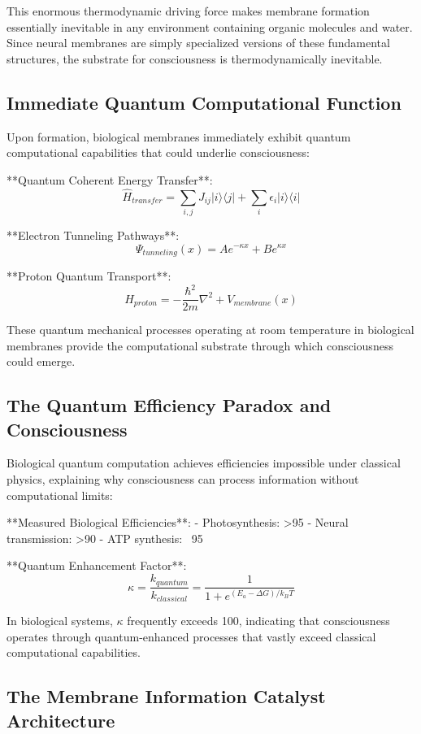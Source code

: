 \documentclass[12pt]{article}
\begin{document}
This enormous thermodynamic driving force makes membrane formation essentially inevitable in any environment containing organic molecules and water. Since neural membranes are simply specialized versions of these fundamental structures, the substrate for consciousness is thermodynamically inevitable.

\subsection{Immediate Quantum Computational Function}

Upon formation, biological membranes immediately exhibit quantum computational capabilities that could underlie consciousness:

**Quantum Coherent Energy Transfer**:
$$\hat{H}_{transfer} = \sum_{i,j} J_{ij} |i\rangle\langle j| + \sum_i \epsilon_i |i\rangle\langle i|$$

**Electron Tunneling Pathways**:
$$\Psi_{tunneling}(x) = A e^{-\kappa x} + B e^{\kappa x}$$

**Proton Quantum Transport**:
$$\hat{H}_{proton} = -\frac{\hbar^2}{2m}\nabla^2 + V_{membrane}(x)$$

These quantum mechanical processes operating at room temperature in biological membranes provide the computational substrate through which consciousness could emerge.

\subsection{The Quantum Efficiency Paradox and Consciousness}

Biological quantum computation achieves efficiencies impossible under classical physics, explaining why consciousness can process information without computational limits:

**Measured Biological Efficiencies**:
- Photosynthesis: >95%
- Neural transmission: >90%
- ATP synthesis: ~95%

**Quantum Enhancement Factor**:
$$\kappa = \frac{k_{quantum}}{k_{classical}} = \frac{1}{1 + e^{(E_a - \Delta G)/k_BT}}$$

In biological systems, $\kappa$ frequently exceeds 100, indicating that consciousness operates through quantum-enhanced processes that vastly exceed classical computational capabilities.

\subsection{The Membrane Information Catalyst Architecture}
\end{document}
